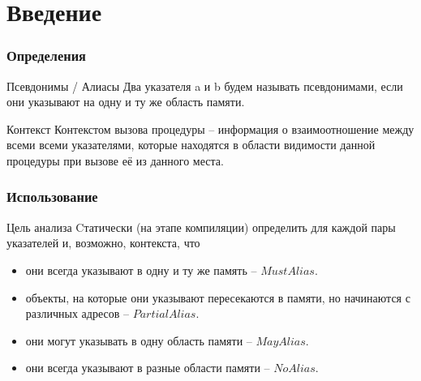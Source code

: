 \documentclass[utf8,russian]{beamer}
\begin{document}
\section{Введение}

\begin{frame}
\frametitle{Определения}

\begin{block}{Псевдонимы / Алиасы}
Два указателя a и b будем называть псевдонимами, если они указывают на одну и ту же область памяти.
\end{block}

\begin{block}{Контекст}
Контекстом вызова процедуры -- информация о взаимоотношение между всеми всеми указателями, которые находятся в области видимости данной процедуры при вызове её из данного места.
\end{block}

\end{frame}


\begin{frame}
\frametitle{Использование}

\begin{block}{Цель анализа}
Cтатически (на этапе компиляции) определить для каждой пары указателей и, возможно, контекста, что
\begin{itemize}
\item они всегда указывают в одну и ту же память -- $MustAlias$.
\item объекты, на которые они указывают пересекаются в памяти, но начинаются с различных адресов -- $PartialAlias$.
\item они могут указывать в одну область памяти -- $MayAlias$.
\item они всегда указывают в разные области памяти -- $NoAlias$.
\end{itemize}
\end{block}

\end{frame}

\end{document}
